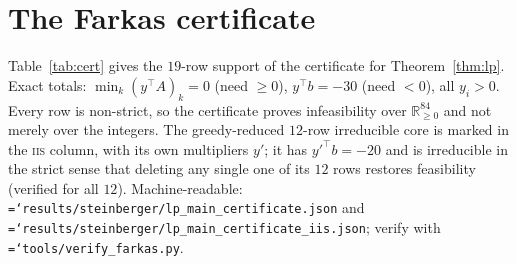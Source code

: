 \documentclass[11pt]{article}
\theoremstyle{definition}
\newcommand{\art}[1]{{\texttt{\hyphenchar\font=`\-\relax #1}}}
\begin{document}
\section{The Farkas certificate}
\label{sec:certificate}

Table~\ref{tab:cert} gives the $19$-row support of the certificate for
Theorem~\ref{thm:lp}. Exact totals: $\min_k (y^\top A)_k = 0$ (need $\ge 0$),
$y^\top b = -30$ (need $<0$), all $y_i > 0$. Every row is non-strict, so the
certificate proves infeasibility over $\mathbb{R}^{84}_{\ge0}$ and not merely over
the integers. The greedy-reduced $12$-row irreducible core is marked in the
\textsc{iis} column, with its own multipliers $y'$; it has $y'^\top b = -20$ and is
irreducible in the strict sense that deleting any single one of its $12$ rows
restores feasibility (verified for all $12$). Machine-readable:
\art{results/steinberger/lp\_main\_certificate.json} and
\art{results/steinberger/lp\_main\_certificate\_iis.json}; verify with
\art{tools/verify\_farkas.py}.
\end{document}
